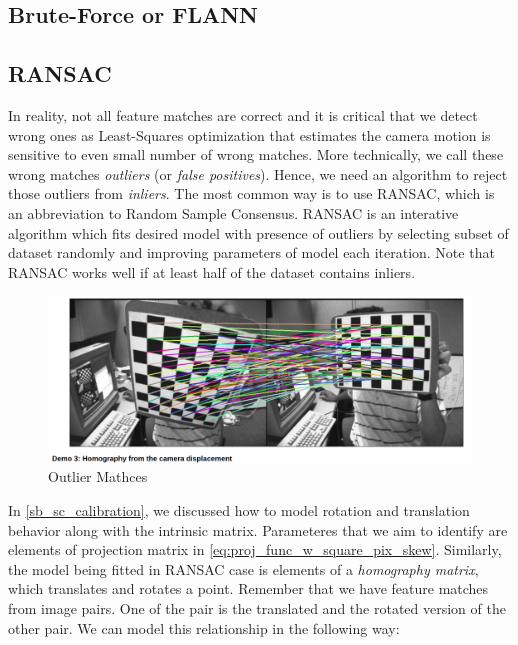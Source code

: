 \documentclass[a4paper]{report}
\numberwithin{figure}{section}
\begin{document}
\subsection{Brute-Force or FLANN} \label{sb_sc_}

\subsection{RANSAC} \label{sb_sc_ransac}

In reality, not all feature matches are correct and it is critical that we 
detect wrong ones as Least-Squares optimization that estimates the camera 
motion is sensitive to even small number of wrong matches. More technically,
we call these 
wrong matches \textit{outliers} (or \textit{false positives}). Hence, 
we need an algorithm to reject those outliers from \textit{inliers}. 
The most common way is to use RANSAC, which is an abbreviation to 
Random Sample Consensus. RANSAC is an interative algorithm which 
fits desired model with presence of outliers by selecting subset of dataset 
randomly and improving parameters of model each iteration. Note that 
RANSAC works 
well if at least half of the dataset contains inliers. 

\begin{figure}[H]
	\centering
	\includegraphics[width=\linewidth,natwidth=640,natheight=640]
  {fig/ref_imgs/outlier_matches.png}
  \caption{Outlier Mathces}
	\label{fig:outlier_matches}
\end{figure}

In \ref{sb_sc_calibration}, we discussed how to model rotation and translation 
behavior along with the intrinsic matrix. Parameteres that we aim to 
identify are elements of projection matrix in \ref{eq:proj_func_w_square_pix_skew}. 
Similarly, the model being fitted in RANSAC case is elements of a 
\textit{homography matrix}, 
which translates and rotates a point.
Remember that we have feature matches from image pairs. One of the pair is 
the translated and the rotated version of the other pair. 
We can 
model this relationship in the following way:
\end{document}
